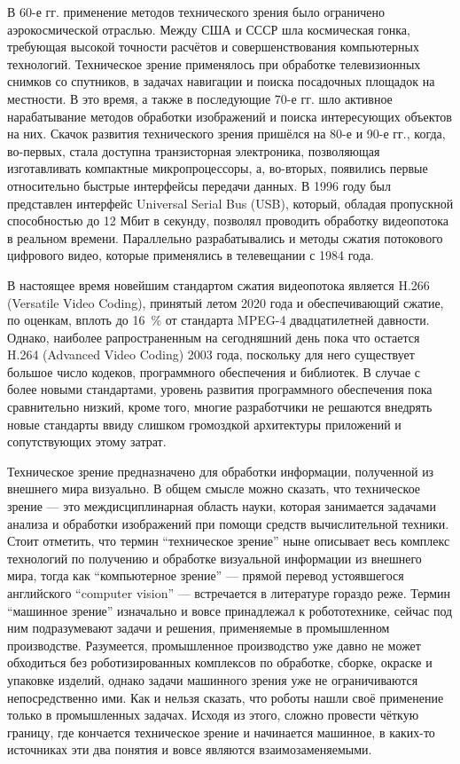 В 60-е гг. применение методов технического зрения было ограничено аэрокосмической отраслью. Между США и СССР шла космическая гонка, требующая высокой точности расчётов и совершенствования компьютерных технологий. Техническое зрение применялось при обработке телевизионных снимков со спутников, в задачах навигации и поиска посадочных площадок на местности. В это время, а также в последующие 70-е гг. шло активное нарабатывание методов обработки изображений и поиска интересующих объектов на них. Скачок развития технического зрения пришёлся на 80-е и 90-е гг., когда, во-первых, стала доступна транзисторная электроника, позволяющая изготавливать компактные микропроцессоры, а, во-вторых, появились первые относительно быстрые интерфейсы передачи данных. В 1996 году был представлен интерфейс Universal Serial Bus (USB), который, обладая пропускной способностью до 12 Мбит в секунду, позволял проводить обработку видеопотока в реальном времени. Параллельно разрабатывались и методы сжатия потокового цифрового видео, которые применялись в телевещании с 1984 года. 

В настоящее время новейшим стандартом сжатия видеопотока является H.266 (Versatile Video Coding), принятый летом 2020 года и обеспечивающий сжатие, по оценкам, вплоть до 16~\% от стандарта MPEG-4 двадцатилетней давности. Однако, наиболее рапространенным на сегодняшний день пока что остается H.264 (Advanced Video Coding) 2003 года, поскольку для него существует большое число кодеков, программного обеспечения и библиотек. В случае с более новыми стандартами, уровень развития программного обеспечения пока сравнительно низкий, кроме того, многие разработчики не решаются внедрять новые стандарты ввиду слишком громоздкой архитектуры приложений и сопутствующих этому затрат.

Техническое зрение предназначено для обработки информации, полученной из внешнего мира визуально. В общем смысле можно сказать, что техническое зрение --- это междисциплинарная область науки, которая занимается задачами анализа и обработки изображений при помощи средств вычислительной техники. Стоит отметить, что термин ``техническое зрение'' ныне описывает весь комплекс технологий по получению и обработке визуальной информации из внешнего мира, тогда как ``компьютерное зрение'' --- прямой перевод устоявшегося английского ``computer vision'' --- встречается в литературе гораздо реже. Термин ``машинное зрение'' изначально и вовсе принадлежал к робототехнике, сейчас под ним подразумевают задачи и решения, применяемые в промышленном производстве. Разумеется, промышленное производство уже давно не может обходиться без роботизированных комплексов по обработке, сборке, окраске и упаковке изделий, однако задачи машинного зрения уже не ограничиваются непосредственно ими. Как и нельзя сказать, что роботы нашли своё применение только в промышленных задачах. Исходя из этого, сложно провести чёткую границу, где кончается техническое зрение и начинается машинное, в каких-то источниках эти два понятия и вовсе являются взаимозаменяемыми.

